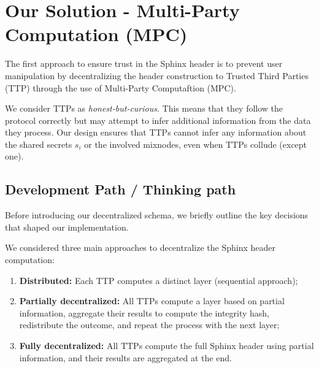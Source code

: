 \newpage
\section{Our Solution - Multi-Party Computation (MPC)}\label{sec:scheme}

The first approach to ensure trust in the Sphinx header is to prevent user manipulation by decentralizing the header construction to Trusted Third Parties (TTP) through the use of Multi-Party Computaftion (MPC).
\newline

We consider TTPs as \textit{honest-but-curious}.
This means that they follow the protocol correctly but may attempt to infer additional information from the data they process.
Our design ensures that TTPs cannot infer any information about the shared secrets $ s_i $ or the involved mixnodes, even when TTPs collude (except one).

\subsection{Development Path / Thinking path}

Before introducing our decentralized schema, we briefly outline the key decisions that shaped our implementation.
\newline

\noindent We considered three main approaches to decentralize the Sphinx header computation:
\begin{enumerate}
    \item \textbf{Distributed:} Each TTP computes a distinct layer (sequential approach);
    \item \textbf{Partially decentralized:} All TTPs compute a layer based on partial information, aggregate their results to compute the integrity hash, redistribute the outcome, and repeat the process with the next layer;
    \item \textbf{Fully decentralized:} All TTPs compute the full Sphinx header using partial information, and their results are aggregated at the end.
\end{enumerate}

